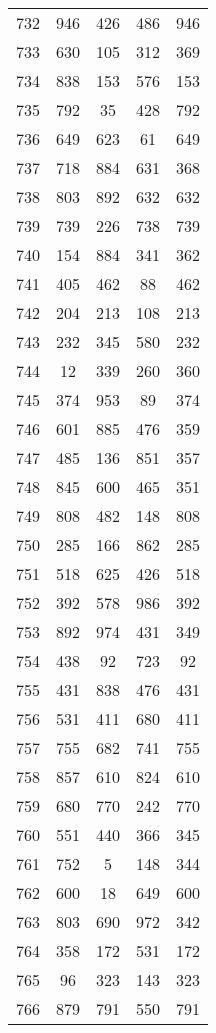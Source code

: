 \documentclass[a4paper,10pt,ngerman]{scrartcl}
\begin{document}
\begin{longtable}[c]{c|c|c|c|c}
    732 & 946 & 426 & 486 & 946 \\
    733 & 630 & 105 & 312 & 369 \\
    734 & 838 & 153 & 576 & 153 \\
    735 & 792 & 35 & 428 & 792 \\
    736 & 649 & 623 & 61 & 649 \\
    737 & 718 & 884 & 631 & 368 \\
    738 & 803 & 892 & 632 & 632 \\
    739 & 739 & 226 & 738 & 739 \\
    740 & 154 & 884 & 341 & 362 \\
    741 & 405 & 462 & 88 & 462 \\
    742 & 204 & 213 & 108 & 213 \\
    743 & 232 & 345 & 580 & 232 \\
    744 & 12 & 339 & 260 & 360 \\
    745 & 374 & 953 & 89 & 374 \\
    746 & 601 & 885 & 476 & 359 \\
    747 & 485 & 136 & 851 & 357 \\
    748 & 845 & 600 & 465 & 351 \\
    749 & 808 & 482 & 148 & 808 \\
    750 & 285 & 166 & 862 & 285 \\
    751 & 518 & 625 & 426 & 518 \\
    752 & 392 & 578 & 986 & 392 \\
    753 & 892 & 974 & 431 & 349 \\
    754 & 438 & 92 & 723 & 92 \\
    755 & 431 & 838 & 476 & 431 \\
    756 & 531 & 411 & 680 & 411 \\
    757 & 755 & 682 & 741 & 755 \\
    758 & 857 & 610 & 824 & 610 \\
    759 & 680 & 770 & 242 & 770 \\
    760 & 551 & 440 & 366 & 345 \\
    761 & 752 & 5 & 148 & 344 \\
    762 & 600 & 18 & 649 & 600 \\
    763 & 803 & 690 & 972 & 342 \\
    764 & 358 & 172 & 531 & 172 \\
    765 & 96 & 323 & 143 & 323 \\
    766 & 879 & 791 & 550 & 791 \\

\end{longtable}
\end{document}
